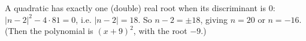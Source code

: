 A quadratic has exactly one (double) real root when its discriminant is $0$: $|n-2|^2-4\cdot81=0$, i.e. $|n-2|=18$. So $n-2=\pm18$, giving $\boxed{n=20\text{ or }n=-16}$. (Then the polynomial is $(x+9)^2$, with the root $-9$.)
